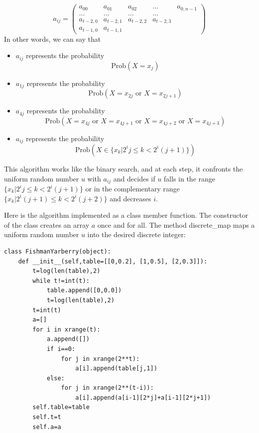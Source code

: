 \documentclass[justified,sixbynine]{tufte-book}
\theoremstyle{plain}%
\theoremstyle{definition}
\theoremstyle{remark}
\begin{document}
\begin{fullwidth}
\begin{equation}
a_{ij}=
\begin{pmatrix}
a_{00} & a_{01} & a_{02} & \dots & a_{0,n-1} \\
\dots & \dots & \dots & \dots &  \\
a_{t-2,0} & a_{t-2,1} & a_{t-2,2} & a_{t-2,3} &  \\
a_{t-1,0} & a_{t-1,1} &  &  &
\end{pmatrix}
\end{equation}
In other words, we can say that

\begin{itemize}
\item  $a_{ij}$ represents the probability
\begin{equation}
\textrm{Prob}(X=x_j)
\end{equation}

\item  $a_{1j}$ represents the probability
\begin{equation}
\textrm{Prob}(X=x_{2j}\text{ or }X=x_{2j+1})
\end{equation}

\item  $a_{4j}$ represents the probability
\begin{equation}
\textrm{Prob}(X=x_{4j}\text{ or }X=x_{4j+1}\text{ or }X=x_{4j+2}\text{ or }X=x_{4j+3})
\end{equation}

\item  $a_{ij}$ represents the probability
\begin{equation}
\textrm{Prob}(X\in \{x_k|2^ij\leq k<2^i(j+1)\})
\end{equation}
\end{itemize}

This algorithm works like the binary search, and at each step, it confronts the
uniform random number $u$ with $a_{ij}$ and decides if $u$ falls in the
range $\{x_k|2^ij\leq k<2^i(j+1)\}$ or in the complementary range $%
\{x_k|2^i(j+1)\leq k<2^i(j+2)\}$ and decreases $i.$

Here is the algorithm implemented as a class member function. The
constructor of the class creates an array $a$ once and for all. The method
discrete\_map maps a uniform random number $u$ into the desired discrete
integer:


\begin{lstlisting}
class FishmanYarberry(object):
    def __init__(self,table=[[0,0.2], [1,0.5], [2,0.3]]):
        t=log(len(table),2)
        while t!=int(t):
            table.append([0,0.0])
            t=log(len(table),2)
        t=int(t)
        a=[]
        for i in xrange(t):
            a.append([])
            if i==0:
                for j in xrange(2**t):
                    a[i].append(table[j,1])
            else:
                for j in xrange(2**(t-i)):
                    a[i].append(a[i-1][2*j]+a[i-1][2*j+1])
        self.table=table
        self.t=t
        self.a=a


\end{lstlisting}
\end{fullwidth}
\end{document}
